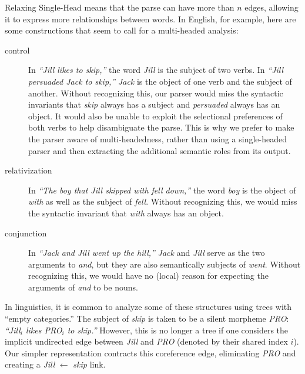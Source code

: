 \documentclass[a4paper,11pt]{article}
\begin{document}
Relaxing {\sc Single-Head} means that the parse can have more than $n$ edges, allowing it to express more relationships between words.  
In English, for example, here are some constructions that seem to call for a multi-headed analysis:
\begin{description}
\item[control] In {\em ``Jill likes to skip,''} the word {\em Jill} is the subject of two verbs.  In {\em ``Jill persuaded Jack to skip,''} {\em Jack} is the object of one verb and the subject of another.  Without recognizing this, our parser would miss the syntactic invariants that {\em skip} always has a subject and {\em persuaded} always has an object.  It would also be unable to exploit the selectional preferences of both verbs to help disambiguate the parse.  This is why we prefer to make the parser aware of multi-headedness, rather than using a single-headed parser and then extracting the additional semantic roles from its output.
\item[relativization] In {\em ``The boy that Jill skipped with fell down,''} the word {\em boy} is the object of {\em with} as well as the subject of {\em fell}.  Without recognizing this, we would miss the syntactic invariant that {\em with} always has an object.  
\item[conjunction] In {\em ``Jack and Jill went up the hill,''} {\em Jack} and {\em Jill} serve as the two arguments to {\em and}, but they are also semantically subjects of {\em went}.  Without recognizing this, we would have no (local) reason for expecting the arguments of {\em and} to be nouns.
\end{description}

\noindent In linguistics, it is common to analyze some of these structures using trees with ``empty categories.''  The subject of {\em skip} is taken to be a silent morpheme {\em PRO}:
{\em ``Jill$_i$ likes PRO$_i$ to skip.''}  However, this is no longer a tree if one considers the implicit undirected edge between {\em Jill} and {\em PRO} (denoted by their shared index $i$).  Our simpler representation contracts this coreference edge, eliminating {\em PRO} and creating a {\em Jill} $\leftarrow$ {\em skip} link.  

\medskip
\end{document}
